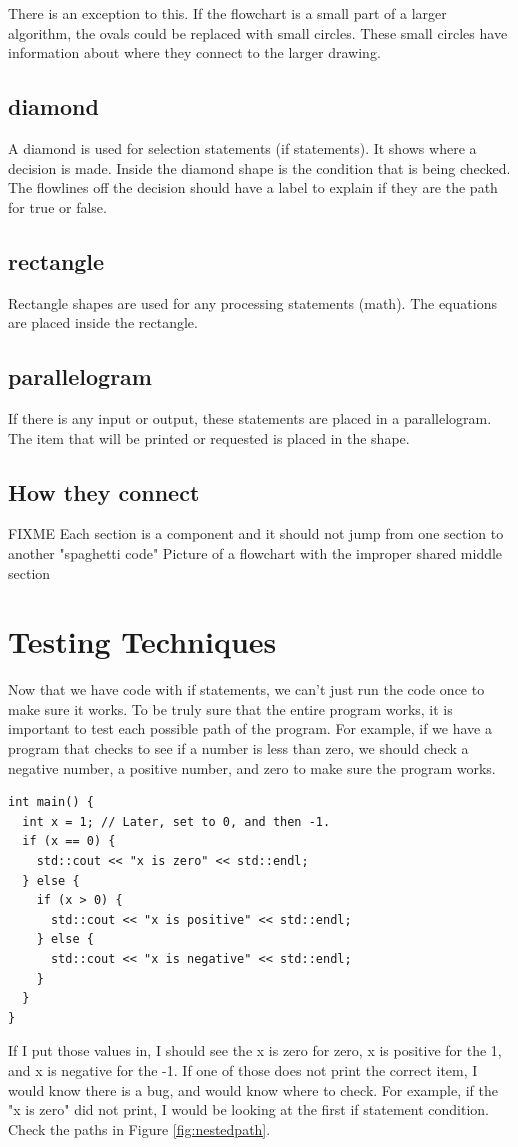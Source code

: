 There is an exception to this. If the flowchart
is a small part of a larger algorithm, the ovals could be replaced with small circles. These small circles have information about where they connect to the larger drawing.
\subsection{diamond}
A diamond is used for selection statements (if statements). It shows where a decision is made. Inside the diamond shape is the condition that is being checked. The flowlines off the decision should have a label to explain if they are the path for true or false. 
\subsection{rectangle}
Rectangle shapes are used for any processing statements (math). The equations are placed inside the rectangle.
\subsection{parallelogram}
If there is any input or output, these statements are placed in a parallelogram. The
item that will be printed or requested is placed in the shape.
\subsection{How they connect}
FIXME
Each section is a component and it should not jump from one section to another
"spaghetti code"
Picture of a flowchart with the improper shared middle section

\section{Testing Techniques}
Now that we have code with if statements, we can't just run the 
code once to make sure it works. To be truly sure that the entire
program works, it is important to test each possible path of the
program. For example, if we have a program that checks to see if
a number is less than zero, we should check a negative number, 
a positive number, and zero to make sure the program works. 

\begin{lstlisting}
int main() {
  int x = 1; // Later, set to 0, and then -1.
  if (x == 0) {
    std::cout << "x is zero" << std::endl;
  } else {
    if (x > 0) {
      std::cout << "x is positive" << std::endl;
    } else {
      std::cout << "x is negative" << std::endl;
    }
  }
}
\end{lstlisting}
If I put those values in, I should see the x is zero for zero, x is
positive for the 1, and x is negative for the -1. If one of those does not print the correct item, I would know there is a bug, and 
would know where to check. For example, if the "x is zero" did not print, I would be looking at the first if statement condition. Check
the paths in Figure \ref{fig:nestedpath}.

